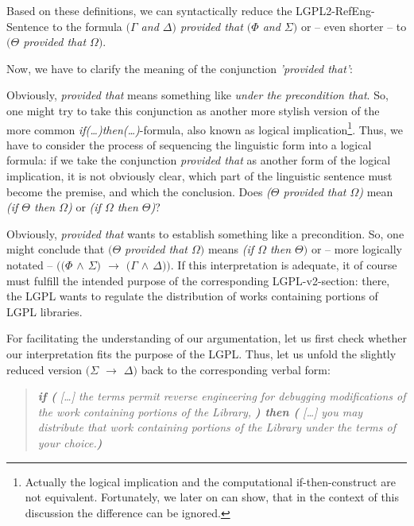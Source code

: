 Based on these definitions, we can syntactically reduce the
LGPL2-RefEng-Sentence to the formula \emph{$(\Gamma$ and $\Delta)$ provided that
$(\Phi$ and $\Sigma)$} or -- even shorter -- to \emph{$(\Theta$ provided that
$\Omega)$}.

Now, we have to clarify the meaning of the conjunction \emph{'provided that'}:

Obviously, \emph{provided that} means something like \emph{under the
precondition that}. So, one might try to take this conjunction as another more
stylish version of the more common \emph{if(\ldots)then(\ldots)}-formula, also
known as logical implication\footnote{Actually the logical implication and the
computational if-then-construct are not equivalent. Fortunately, we later on can
show, that in the context of this discussion the difference can be ignored.}.
Thus, we have to consider the process of sequencing the linguistic form into a
logical formula: if we take the conjunction \emph{provided that} as another form
of the logical implication, it is not obviously clear, which part of the 
linguistic sentence must become the premise, and which the conclusion. Does
\emph{($\Theta$ provided that $\Omega$)} mean \emph{(if $\Theta$ then $\Omega$)}
or \emph{(if $\Omega$ then $\Theta$)}?

Obviously, \emph{provided that} wants to establish something like a
precondition. So, one might conclude that \emph{$(\Theta$ provided that
$\Omega)$} means \emph{(if $\Omega$ then $\Theta)$} or -- more logically notated
-- \emph{$((\Phi$ $\wedge$ $\Sigma)$ $\rightarrow$ $(\Gamma$ $\wedge$
$\Delta))$}. If this interpretation is adequate, it of course must fulfill the
intended purpose of the corresponding LGPL-v2-section: there, the LGPL wants to
regulate the distribution of works containing portions of LGPL libraries.

For facilitating the understanding of our argumentation, let us first check
whether our interpretation fits the purpose of the LGPL. Thus, let us unfold the
slightly reduced version \emph{$(\Sigma$ $\rightarrow$ $\Delta)$} back to the
corresponding verbal form:

\begin{quote}\noindent\emph{\textbf{if (} [\ldots] the terms permit reverse
engineering for debugging modifications of the work containing portions of the
Library, \textbf{) then (} [\ldots] you may distribute that work containing
portions of the Library under the terms of your choice.\textbf{)}}\end{quote}


